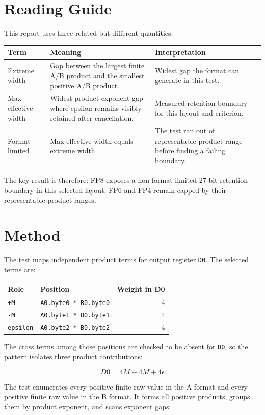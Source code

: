 \documentclass[11pt]{article}
\begin{document}
\section{Reading Guide}

This report uses three related but different quantities:

\begin{tabularx}{\linewidth}{l Y Y}
\toprule
Term & Meaning & Interpretation \\
\midrule
Extreme width & Gap between the largest finite A/B product and the smallest
positive A/B product. & Widest gap the format can generate in this test. \\
Max effective width & Widest product-exponent gap where epsilon remains visibly
retained after cancellation. & Measured retention boundary for this layout and
criterion. \\
Format-limited & Max effective width equals extreme width. & The test ran out
of representable product range before finding a failing boundary. \\
\bottomrule
\end{tabularx}

The key result is therefore: FP8 exposes a non-format-limited 27-bit retention
boundary in this selected layout; FP6 and FP4 remain capped by their
representable product ranges.

\section{Method}

The test maps independent product terms for output register \texttt{D0}. The
selected terms are:

\begin{tabularx}{\linewidth}{l Y R}
\toprule
Role & Position & Weight in D0 \\
\midrule
\texttt{+M} & \texttt{A0.byte0 * B0.byte0} & 4 \\
\texttt{-M} & \texttt{A0.byte1 * B0.byte1} & 4 \\
\texttt{epsilon} & \texttt{A0.byte2 * B0.byte2} & 4 \\
\bottomrule
\end{tabularx}

The cross terms among those positions are checked to be absent for
\texttt{D0}, so the pattern isolates three product contributions:

\[
  D0 = 4M - 4M + 4\epsilon
\]

The test enumerates every positive finite raw value in the A format and every
positive finite raw value in the B format. It forms all positive products,
groups them by product exponent, and scans exponent gaps:
\end{document}

